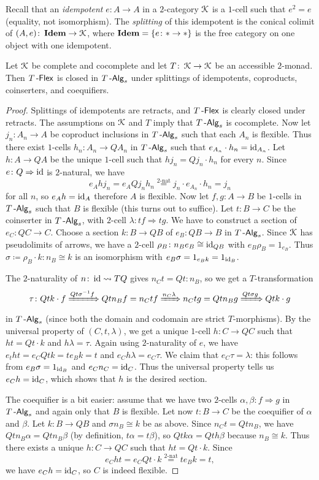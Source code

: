 \documentclass[a4paper,11pt,oneside,openany]{scrbook}
\begin{document}
Recall that an \emph{idempotent} $e\colon A\to A$ in a $2$-category $\operatorname{\mathcal{K}}$ is a $1$-cell such that $e^2=e$ (equality, not isomorphism). The \emph{splitting} of this idempotent is the conical colimit of $(A,e)\colon \operatorname{\mathbf{Idem}}\to\operatorname{\mathcal{K}}$, where $\operatorname{\mathbf{Idem}}=\{e\colon*\to*\}$ is the free category on one object with one idempotent. 
\begin{thm}
    Let $\operatorname{\mathcal{K}}$ be complete and cocomplete and let $T\colon\operatorname{\mathcal{K}}\to\operatorname{\mathcal{K}}$ be an accessible $2$-monad. Then $T\operatorname{-\mathsf{Flex}}$ is closed in $T\operatorname{-\mathsf{Alg}}_s$ under splittings of idempotents, coproducts, coinserters, and coequifiers.
\end{thm}
\begin{proof}
 Splittings of idempotents are retracts, and $T\operatorname{-\mathsf{Flex}}$ is clearly closed under retracts. The assumptions on $\operatorname{\mathcal{K}}$ and $T$ imply that $T\operatorname{-\mathsf{Alg}}_s$ is cocomplete. Now let $j_n\colon A_n\to A$ be coproduct inclusions in $T\operatorname{-\mathsf{Alg}}_s$ such that each $A_n$ is flexible. Thus there exist $1$-cells $h_n\colon A_n\to QA_n$ in $T\operatorname{-\mathsf{Alg}}_s$ such that $e_{A_n}\cdot h_n=\operatorname{id}_{A_n}$. Let $h\colon A\to QA$ be the unique $1$-cell such that $hj_n=Qj_n\cdot h_n$ for every $n$. Since $e\colon Q\Rightarrow\operatorname{id}$ is $2$-natural, we have
 $$e_Ahj_n = e_AQj_nh_n\overset{2\mbox{-}\text{nat}}{=}j_n\cdot e_{A_n}\cdot h_n=j_n$$
 for all $n$, so $e_Ah=\operatorname{id}_A$ therefore $A$ is flexible.
 Now let $f,g\colon A\to B$ be $1$-cells in $T\operatorname{-\mathsf{Alg}}_s$ such that $B$ is flexible (this turns out to suffice). Let $t\colon B\to C$ be the coinserter in $T\operatorname{-\mathsf{Alg}}_s$, with $2$-cell $\lambda\colon tf\Rightarrow tg$. We have to construct a section of $e_C\colon QC\to C$. Choose a section $k\colon B\to QB$ of $e_B\colon QB\to B$ in $T\operatorname{-\mathsf{Alg}}_s$. Since $\operatorname{\mathcal{K}}$ has pseudolimits of arrows, we have a $2$-cell $\rho_B\colon n_Be_B\cong \operatorname{id}_{QB}$ with $e_B\rho_B=1_{e_B}$. Thus $\sigma\coloneqq\rho_B\cdot k\colon n_B\cong k$ is an isomorphism with $e_B\sigma = 1_{e_Bk}=1_{\operatorname{id}_B}$. 
 
 The $2$-naturality of $n\colon\operatorname{id}\rightsquigarrow TQ$ gives $n_C t=Qt\colon n_B$, so we get a $T$-transformation
 $$\tau\colon Qtk\cdot f\xRightarrow{Qt\sigma^{-1}f}Qtn_Bf=n_Ctf\xRightarrow{n_C\lambda}n_Ctg=Qtn_Bg\xRightarrow{Qt\sigma g}Qtk\cdot g$$ in $T\operatorname{-\mathsf{Alg}}_s$ (since both the domain and codomain are strict $T$-morphisms). By the universal property of $(C,t,\lambda)$, we get a unique $1$-cell $h\colon C\to QC$ such that $ht=Qt\cdot k$ and $h\lambda=\tau$. Again using $2$-naturality of $e$, we have $e_tht=e_CQtk=te_Bk=t$ and $e_Ch\lambda=e_C\tau$. We claim that $e_C\tau=\lambda$: this follows from $e_B\sigma=1_{\operatorname{id}_B}$ and $e_Cn_C=\operatorname{id}_C$. Thus the universal property tells us $e_Ch=\operatorname{id}_C$, which shows that $h$ is the desired section.
 
 The coequifier is a bit easier: assume that we have two $2$-cells $\alpha,\beta\colon f\Rightarrow g$ in $T\operatorname{-\mathsf{Alg}}_s$ and again only that $B$ is flexible. Let now $t\colon B\to C$ be the coequifier of $\alpha$ and $\beta$. Let $k\colon B\to QB$ and $\sigma n_B\cong k$ be as above. Since $n_Ct = Qt n_B$, we have $Qtn_B\alpha=Qtn_B\beta$ (by definition, $t\alpha=t\beta$), so $Qtk\alpha = Qth\beta$ because $n_B\cong k$. Thus there exists a unique $h\colon C\to QC$ such that $ht=Qt\cdot k$. Since 
 $$e_Cht=e_CQt\cdot k\overset{2\mbox{-}\text{nat}}{=} te_Bk = t,$$
 we have $e_Ch=\operatorname{id}_C$, so $C$ is indeed flexible.
\end{proof} 
\end{document}

